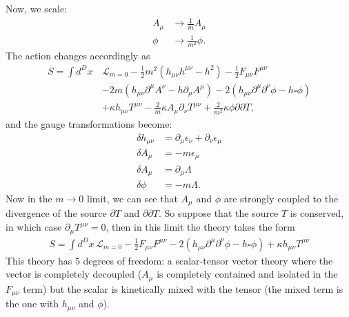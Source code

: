 \documentclass{book}
\theoremstyle{definition}
\newcommand{\p}{\partial}
\newcommand{\lag}{\mathcal{L}}
\newcommand{\nn}{\nonumber}
\newcommand{\f}[2]{\frac{#1}{#2}}
\newcommand{\lp}{\left(}
\newcommand{\rp}{\right)}
\begin{document}
Now, we scale:
\begin{align}
A_\mu &\to \f{1}{m}A_\mu\nn\\
\phi &\to \f{1}{m^2}\phi.
\end{align}
The action changes accordingly as
\begin{align}
S = \int d^Dx\, &\lag_{m=0} - \f{1}{2}m^2\lp h_{\mu\nu}h^{\mu\nu} - h^2 \rp - \f{1}{2} F_{\mu\nu}F^{\mu\nu}\nn\\
&-2m\lp h_{\mu\nu} \p^\mu A^\nu - h\p_\mu A^\mu \rp -2\lp h_{\mu\nu}\p^\mu \p^\nu \phi - h\square \phi \rp\nn\\
&+\kappa h_{\mu\nu}T^{\mu\nu} - \f{2}{m}\kappa A_\mu \p_\nu T^{\mu\nu} + \f{2}{m^2}\kappa \phi \p \p T,
\end{align}
and the gauge transformations become:
\begin{align}
\delta h_{\mu\nu} &= \p_\mu \epsilon_\nu + \p_\nu\epsilon_\mu\nn\\
\delta A_\mu &= -m\epsilon_\mu \nn\\
\delta A_\mu &= \p_\mu \Lambda\nn\\
\delta \phi &= -m\Lambda.
\end{align}
Now in the $m \to  0$ limit, we can see that $A_\mu$ and $\phi$ are strongly coupled to the divergence of the source $\p T$ and $\p \p T$. So suppose that the source $T$ is conserved, in which case $\p_\mu T^{\mu\nu} = 0$, then in this limit the theory takes the form
\begin{align}
\boxed{S = \int d^Dx\, \lag_{m=0}  - \f{1}{2} F_{\mu\nu}F^{\mu\nu}  -2\lp h_{\mu\nu}\p^\mu \p^\nu \phi - h\square \phi \rp +\kappa h_{\mu\nu}T^{\mu\nu} }
\end{align} 
This theory has 5 degrees of freedom: a scalar-tensor vector theory where the vector is completely decoupled ($A_\mu$ is completely contained and isolated in the $F_{\mu\nu}$ term) but the scalar is kinetically mixed with the tensor (the mixed term is the one with $h_{\mu\nu}$ and $\phi$). \\
\end{document}
